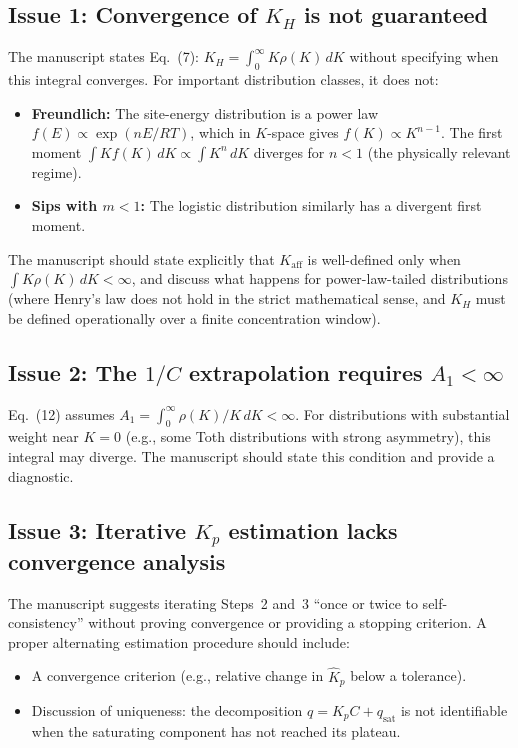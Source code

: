 \documentclass[12pt]{article}
\begin{document}
\subsection{Issue 1: Convergence of $K_H$ is not guaranteed}

The manuscript states Eq.~(7): $K_H=\int_0^\infty K\rho(K)\,dK$ without
specifying when this integral converges.  For important distribution
classes, it does not:

\begin{itemize}[nosep]
  \item \textbf{Freundlich:} The site-energy distribution is a power law
        $f(E)\propto \exp(nE/RT)$, which in $K$-space gives
        $f(K)\propto K^{n-1}$.  The first moment
        $\int K f(K)\,dK \propto \int K^n\,dK$ diverges for $n<1$
        (the physically relevant regime).
  \item \textbf{Sips with $m<1$:} The logistic distribution similarly has
        a divergent first moment.
\end{itemize}

The manuscript should state explicitly that $K_{\mathrm{aff}}$ is
well-defined only when $\int K\rho(K)\,dK<\infty$, and discuss what
happens for power-law-tailed distributions (where Henry's law does not
hold in the strict mathematical sense, and $K_H$ must be defined
operationally over a finite concentration window).

\subsection{Issue 2: The $1/C$ extrapolation requires $A_1<\infty$}

Eq.~(12) assumes $A_1=\int_0^\infty \rho(K)/K\,dK<\infty$.  For
distributions with substantial weight near $K=0$ (e.g., some Toth
distributions with strong asymmetry), this integral may diverge.  The
manuscript should state this condition and provide a diagnostic.

\subsection{Issue 3: Iterative $K_p$ estimation lacks convergence analysis}

The manuscript suggests iterating Steps~2 and~3 ``once or twice to
self-consistency'' without proving convergence or providing a stopping
criterion.  A proper alternating estimation procedure should include:
\begin{itemize}[nosep]
  \item A convergence criterion (e.g., relative change in
        $\widehat{K}_p$ below a tolerance).
  \item Discussion of uniqueness: the decomposition
        $q=K_p C + q_{\mathrm{sat}}$ is not identifiable when the
        saturating component has not reached its plateau.
\end{itemize}
\end{document}
